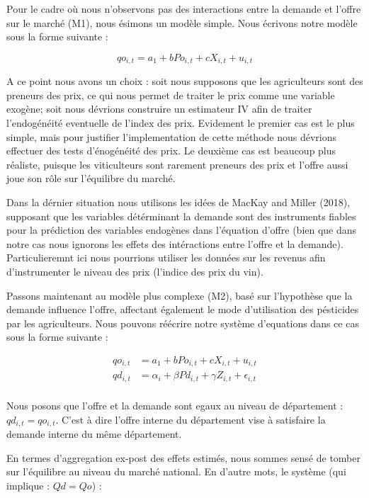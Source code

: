 \documentclass[11pt,]{article}
\begin{document}
Pour le cadre où nous n'observons pas des interactions entre la demande
et l'offre sur le marché (M1), nous ésimons un modèle simple. Nous
écrivons notre modèle sous la forme suivante :

\begin{equation*}
  qo_{i,t} = a_1 + b Po_{i,t} + c X_{i,t} + u_{i,t}
\end{equation*}

A ce point nous avons un choix : soit nous supposons que les
agriculteurs sont des preneurs des prix, ce qui nous permet de traiter
le prix comme une variable exogène; soit nous dévrions construire un
estimateur IV afin de traiter l'endogénéité eventuelle de l'index des
prix. Evidement le premier cas est le plus simple, mais pour justifier
l'implementation de cette méthode nous dévrions effectuer des tests
d'énogénéité des prix. Le deuxième cas est beaucoup plus réaliste,
puisque les viticulteurs sont rarement preneurs des prix et l'offre
aussi joue son rôle sur l'équilibre du marché.

Dans la dérnier situation nous utilisons les idées de MacKay and Miller
(2018), supposant que les variables détérminant la demande sont des
instruments fiables pour la prédiction des variables endogènes dans
l'équation d'offre (bien que dans notre cas nous ignorons les effets des
intéractions entre l'offre et la demande). Particulieremnt ici nous
pourrions utiliser les données sur les revenus afin d'instrumenter le
niveau des prix (l'indice des prix du vin).

Passons maintenant au modèle plus complexe (M2), basé sur l'hypothèse
que la demande influence l'offre, affectant également le mode
d'utilisation des pésticides par les agriculteurs. Nous pouvons réécrire
notre système d'equations dans ce cas sous la forme suivante :

\begin{align*}
  qo_{i,t} & = a_1 + b Po_{i,t} + c X_{i,t} + u_{i,t} \\ 
  qd_{i,t} & = \alpha_{i} + \beta Pd_{i,t} + \gamma Z_{i,t} + \epsilon_{i,t}  \\
\end{align*}

Nous posons que l'offre et la demande sont egaux au niveau de
département : \(qd_{i,t} = qo_{i,t}\). C'est à dire l'offre interne du
département vise à satisfaire la demande interne du même département.

En termes d'aggregation ex-post des effets estimés, nous sommes sensé de
tomber sur l'équilibre au niveau du marché national. En d'autre mots, le
système (qui implique : \(Qd = Qo\)) :
\end{document}
